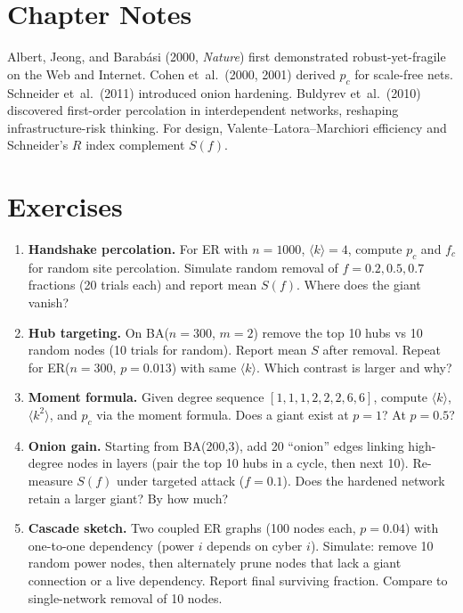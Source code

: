 \section{Chapter Notes}
Albert, Jeong, and Barab\'asi (2000, \emph{Nature}) first demonstrated robust-yet-fragile on the Web and Internet. Cohen et~al.\ (2000, 2001) derived $p_c$ for scale-free nets. Schneider et~al.\ (2011) introduced onion hardening. Buldyrev et~al.\ (2010) discovered first-order percolation in interdependent networks, reshaping infrastructure-risk thinking. For design, Valente--Latora--Marchiori efficiency and Schneider's $R$ index complement $S(f)$.

\section{Exercises}
\label{sec:ch07-exercises}
\begin{enumerate}[label=E7.\arabic*, leftmargin=*, itemsep=0.8em]
    \item \textbf{Handshake percolation.} For ER with $n=1000$, $\langle k\rangle=4$, compute $p_c$ and $f_c$ for random site percolation. Simulate random removal of $f=0.2,0.5,0.7$ fractions (20 trials each) and report mean $S(f)$. Where does the giant vanish?
    \item \textbf{Hub targeting.} On BA($n=300$, $m=2$) remove the top 10 hubs vs 10 random nodes (10 trials for random). Report mean $S$ after removal. Repeat for ER($n=300$, $p=0.013$) with same $\langle k\rangle$. Which contrast is larger and why?
    \item \textbf{Moment formula.} Given degree sequence $[1,1,1,2,2,2,6,6]$, compute $\langle k\rangle$, $\langle k^2\rangle$, and $p_c$ via the moment formula. Does a giant exist at $p=1$? At $p=0.5$?
    \item \textbf{Onion gain.} Starting from BA(200,3), add 20 ``onion'' edges linking high-degree nodes in layers (pair the top 10 hubs in a cycle, then next 10). Re-measure $S(f)$ under targeted attack ($f=0.1$). Does the hardened network retain a larger giant? By how much?
    \item \textbf{Cascade sketch.} Two coupled ER graphs (100 nodes each, $p=0.04$) with one-to-one dependency (power $i$ depends on cyber $i$). Simulate: remove 10 random power nodes, then alternately prune nodes that lack a giant connection or a live dependency. Report final surviving fraction. Compare to single-network removal of 10 nodes.
\end{enumerate}
